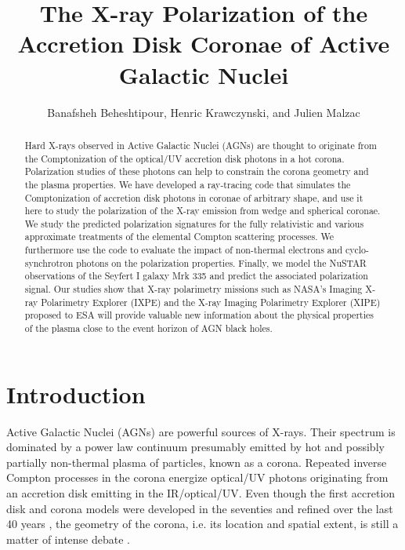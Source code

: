 \documentclass[manuscript]{aastex}
\begin{document}
\title{The X-ray Polarization of the Accretion Disk Coronae of Active Galactic Nuclei}

\author{Banafsheh Beheshtipour, Henric Krawczynski, and Julien Malzac}




\begin{abstract}
Hard X-rays observed in Active Galactic Nuclei (AGNs) are thought to originate from the Comptonization of the optical/UV accretion disk photons in a hot corona. Polarization studies of these photons can help to constrain the corona geometry and the plasma properties. We have developed a ray-tracing code that simulates the Comptonization of accretion disk photons in coronae of arbitrary shape, and use it here to study the polarization of the X-ray emission from wedge and spherical coronae. We study the predicted polarization signatures for the fully relativistic and various approximate treatments of the elemental Compton scattering processes. We furthermore use the code to evaluate the impact of non-thermal electrons and cyclo-synchrotron photons on the polarization properties. Finally, we model the NuSTAR observations of the Seyfert I galaxy Mrk 335 and predict the associated polarization signal.  Our studies show that X-ray polarimetry missions such as NASA's Imaging X-ray Polarimetry Explorer (IXPE) and the X-ray Imaging Polarimetry Explorer (XIPE) proposed to ESA will provide valuable new information about the physical properties of the plasma close to the event horizon of AGN black holes.
\end{abstract}


\section{Introduction}
Active Galactic Nuclei (AGNs) are powerful sources of X-rays. Their spectrum is dominated by a power law continuum presumably emitted by hot and possibly partially non-thermal plasma of particles, known as a corona. Repeated inverse Compton processes in the corona energize  optical/UV photons originating from an accretion disk emitting in the IR/optical/UV. Even though the first accretion disk and corona models were developed in the seventies \citep[e.g][]{sha73,nov73} and refined over the last 40 years \citep[e.g.][]{haa91, dov97, now02}, the geometry of the corona, i.e. its location and spatial extent, is still a matter of intense debate \citep{gil14}.
\end{document}
